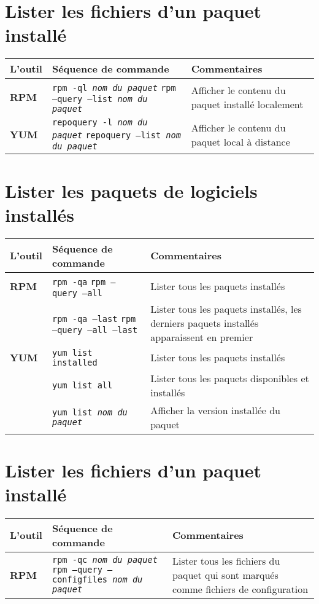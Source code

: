 \documentclass[10pt,a4paper]{article}
\newcommand{\tabellenkopf}{
  \textbf{L'outil} & \textbf{Séquence de commande} & \textbf{Commentaires} \\
}
\begin{document}
\section{Lister les fichiers d'un paquet installé}
\begin{tabular}{ p{3.5cm} p{9cm} p{11cm}}
  \hline
  \rowcolor{Gray}
  \tabellenkopf
  \hline 
  \textbf{RPM} & \texttt{rpm -ql \textit{nom du paquet}} \newline \texttt{rpm --query --list \textit{nom du paquet}} & Afficher le contenu du paquet installé localement\\
  \rowcolor{Gray}
  \textbf{YUM} & \texttt{repoquery -l \textit{nom du paquet}} \newline \texttt{repoquery --list \textit{nom du paquet}} & Afficher le contenu du paquet local à distance \\
  \hline
\end{tabular}
\newpage

\cheatsheet

\section{Lister les paquets de logiciels installés}
\begin{tabular}{ p{3.5cm} p{9cm} p{11cm}}
  \hline
  \rowcolor{Gray}
  \tabellenkopf
  \hline 
  \textbf{RPM} & \texttt{rpm -qa} \newline \texttt{rpm --query --all} & Lister tous les paquets installés\\
  \rowcolor{Gray}
  & \texttt{rpm -qa --last} \newline \texttt{rpm --query --all --last} & Lister tous les paquets installés, les derniers paquets installés apparaissent en premier\\
  \textbf{YUM} & \texttt{yum list installed} & Lister tous les paquets installés\\
  \rowcolor{Gray}
  & \texttt{yum list all} & Lister tous les paquets disponibles et installés\\
  & \texttt{yum list \textit{nom du paquet}} & Afficher la version installée du paquet \\
  \hline
\end{tabular}


\section{Lister les fichiers d'un paquet installé}
\begin{tabular}{ p{3.5cm} p{9cm} p{11cm}}
  \hline
  \rowcolor{Gray}
  \tabellenkopf
  \hline 
  \textbf{RPM} & \texttt{rpm -qc \textit{nom du paquet}} \newline \texttt{rpm --query --configfiles \textit{nom du paquet}} & Lister tous les fichiers du paquet qui sont marqués comme fichiers de configuration\\
  \hline
\end{tabular}
\end{document}
